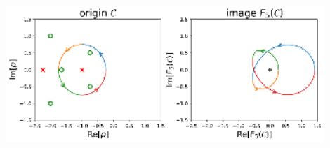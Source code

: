 \begin{center}
    \includegraphics[width=0.9\textwidth]{notebook/fig/output_47_1.eps}
\end{center}
